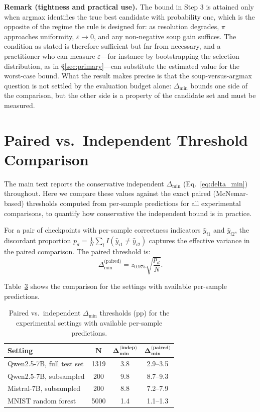\documentclass[pdflatex,sn-mathphys-ay,iicol]{sn-jnl}
\theoremstyle{thmstylethree}
\begin{document}
\begin{table}[t]
\begin{table}[t]
\medskip
\noindent\textbf{Remark (tightness and practical use).} The bound in Step 3 is attained only when argmax identifies the true best candidate with probability one, which is the opposite of the regime the rule is designed for: as resolution degrades, $\pi$ approaches uniformity, $\varepsilon \to 0$, and any non-negative soup gain suffices. The condition as stated is therefore sufficient but far from necessary, and a practitioner who can measure $\varepsilon$---for instance by bootstrapping the selection distribution, as in \S\ref{sec:primary}---can substitute the estimated value for the worst-case bound. What the result makes precise is that the soup-versus-argmax question is not settled by the evaluation budget alone: $\Delta_{\min}$ bounds one side of the comparison, but the other side is a property of the candidate set and must be measured.

\section{Paired vs.\ Independent Threshold Comparison}\label{app:paired}

The main text reports the conservative independent $\Delta_{\min}$ (Eq.~\eqref{eq:delta_min}) throughout. Here we compare these values against the exact paired (McNemar-based) thresholds computed from per-sample predictions for all experimental comparisons, to quantify how conservative the independent bound is in practice.

For a pair of checkpoints with per-sample correctness indicators $\hat y_{i1}$ and $\hat y_{i2}$, the discordant proportion $p_d = \frac{1}{N}\sum_i I(\hat y_{i1} \neq \hat y_{i2})$ captures the effective variance in the paired comparison. The paired threshold is:
\[
\Delta_{\min}^{\text{(paired)}} = z_{0.975} \sqrt{\frac{p_d}{N}}.
\]

Table~\ref{tab:paired_vs_indep} shows the comparison for the settings with available per-sample predictions.

\begin{table}[ht]
\centering
\caption{Paired vs.\ independent $\Delta_{\min}$ thresholds (pp) for the experimental settings with available per-sample predictions.}
\label{tab:paired_vs_indep}
\begin{tabular}{lccc}\toprule
\textbf{Setting} & $\bm{N}$ & $\bm{\Delta_{\min}^{\text{(indep)}}}$ & $\bm{\Delta_{\min}^{\text{(paired)}}}$ \\\midrule
Qwen2.5-7B, full test set & 1319 & 3.8 & 2.9--3.5 \\
Qwen2.5-7B, subsampled & 200 & 9.8 & 8.7--9.3 \\
Mistral-7B, subsampled & 200 & 8.8 & 7.2--7.9 \\
MNIST random forest & 5000 & 1.4 & 1.1--1.3 \\
\bottomrule
\end{tabular}
\end{table}


\end{table}
\end{table}
\end{document}
